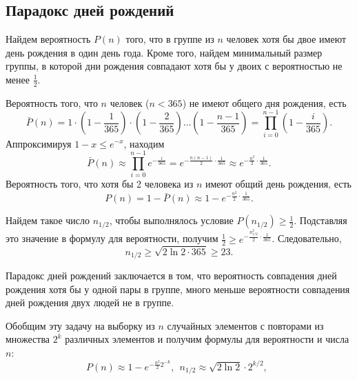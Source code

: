 \subsection{Парадокс дней рождений}

Найдем вероятность $P(n)$ того, что в группе из $n$ человек хотя бы двое имеют день рождения в один день года. Кроме того, найдем минимальный размер группы, в которой дни рождения совпадают хотя бы у двоих с вероятностью не менее $\frac{1}{2}$.

Вероятность того, что $n$ человек ($n < 365$) не имеют общего дня рождения, есть
\[
    \bar{P}(n) = 1 \cdot \left( 1 - \frac{1}{365} \right) \cdot \left(1 - \frac{2}{365} \right)  \dots  \left( 1 - \frac{n-1}{365} \right) = \prod\limits_{i=0}^{n-1} \left( 1 - \frac{i}{365} \right).
\]
Аппроксимируя $1-x \leq e^{-x}$, находим
    \[ \bar{P}(n) \approx \prod\limits_{i=0}^{n-1} e^{-\frac{i}{365}} = e^{-\frac{n(n-1)}{2} \cdot \frac{1}{365}} \approx e^{-\frac{n^2}{2} \cdot \frac{1}{365}}. \]
Вероятность того, что хотя бы 2 человека из $n$ имеют общий день рождения, есть
    \[ P(n) = 1 - \bar{P}(n) \approx 1 -  e^{-\frac{n^2}{2} \cdot \frac{1}{365}}. \]

Найдем такое число $n_{1/2}$, чтобы выполнялось условие $P(n_{1/2}) \geq \frac{1}{2}$. Подставляя это значение в формулу для вероятности,  получим $\frac{1}{2} \geq e^{-\frac{n_{1/2}^2}{2} \cdot \frac{1}{365}}$. Следовательно,
\[
    n_{1/2} \geq \sqrt{2 \ln 2 \cdot 365} \geq 23.
\]

Парадокс дней рождений заключается в том, что вероятность совпадения дней рождения хотя бы у одной пары в группе, много меньше вероятности совпадения дней рождения двух людей не в группе.


Обобщим эту задачу на выборку из $n$ случайных элементов с повторами из множества  $2^k$ различных элементов и получим формулы для вероятности и числа $n$:
\[
    P(n) \approx 1 -  e^{-\frac{n^2}{2} 2^{-k}}, ~~
    n_{1/2} \approx \sqrt{2 \ln 2} \cdot 2^{k/2}, ~~
\]
